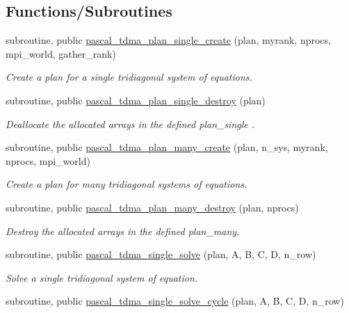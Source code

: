 \subsection*{Functions/\+Subroutines}
\begin{DoxyCompactItemize}
\item 
subroutine, public \hyperlink{namespacepascal__tdma_a5dfc2d7c919b47ad364a74d141532a9f}{pascal\+\_\+tdma\+\_\+plan\+\_\+single\+\_\+create} (plan, myrank, nprocs, mpi\+\_\+world, gather\+\_\+rank)
\begin{DoxyCompactList}\small\item\em Create a plan for a single tridiagonal system of equations. \end{DoxyCompactList}\item 
subroutine, public \hyperlink{namespacepascal__tdma_adb04e59c740ce6c4b9518dd86eaeb594}{pascal\+\_\+tdma\+\_\+plan\+\_\+single\+\_\+destroy} (plan)
\begin{DoxyCompactList}\small\item\em Deallocate the allocated arrays in the defined plan\+\_\+single . \end{DoxyCompactList}\item 
subroutine, public \hyperlink{namespacepascal__tdma_a7e9c24b343ae949044eccc8692dcc6e9}{pascal\+\_\+tdma\+\_\+plan\+\_\+many\+\_\+create} (plan, n\+\_\+sys, myrank, nprocs, mpi\+\_\+world)
\begin{DoxyCompactList}\small\item\em Create a plan for many tridiagonal systems of equations. \end{DoxyCompactList}\item 
subroutine, public \hyperlink{namespacepascal__tdma_aceec478e18d25d413a5bd8a174c3fcb8}{pascal\+\_\+tdma\+\_\+plan\+\_\+many\+\_\+destroy} (plan, nprocs)
\begin{DoxyCompactList}\small\item\em Destroy the allocated arrays in the defined plan\+\_\+many. \end{DoxyCompactList}\item 
subroutine, public \hyperlink{namespacepascal__tdma_ab14e132231d4b53fd65dd333ccc85a50}{pascal\+\_\+tdma\+\_\+single\+\_\+solve} (plan, A, B, C, D, n\+\_\+row)
\begin{DoxyCompactList}\small\item\em Solve a single tridiagonal system of equation. \end{DoxyCompactList}\item 
subroutine, public \hyperlink{namespacepascal__tdma_ac8e377fa86c75126380f0196f6046043}{pascal\+\_\+tdma\+\_\+single\+\_\+solve\+\_\+cycle} (plan, A, B, C, D, n\+\_\+row)

\end{DoxyCompactItemize}
